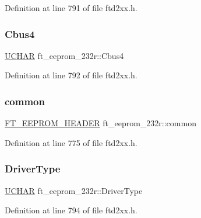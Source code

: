 Definition at line 791 of file ftd2xx.\+h.

\mbox{\label{structft__eeprom__232r_a390714a332684ea05618238e7388773f}} 
\subsubsection{\texorpdfstring{Cbus4}{Cbus4}}
{\footnotesize\ttfamily \hyperlink{CatCaloProto40MHz_2inc_2WinTypes_8h_a4f4bb67531a9bf6f0b9c6ad76aeba587}{U\+C\+H\+AR} ft\+\_\+eeprom\+\_\+232r\+::\+Cbus4}



Definition at line 792 of file ftd2xx.\+h.

\mbox{\label{structft__eeprom__232r_a04ed9a15b88229df4567d6c9ccd6c99d}} 
\subsubsection{\texorpdfstring{common}{common}}
{\footnotesize\ttfamily \hyperlink{LALUsbMLx64_2include_2ftd2xx_8h_ad5a6f519cd67a403fd8742756462394e}{F\+T\+\_\+\+E\+E\+P\+R\+O\+M\+\_\+\+H\+E\+A\+D\+ER} ft\+\_\+eeprom\+\_\+232r\+::common}



Definition at line 775 of file ftd2xx.\+h.

\mbox{\label{structft__eeprom__232r_a43812e19d6119e277b91f10e8db8b651}} 
\subsubsection{\texorpdfstring{Driver\+Type}{DriverType}}
{\footnotesize\ttfamily \hyperlink{CatCaloProto40MHz_2inc_2WinTypes_8h_a4f4bb67531a9bf6f0b9c6ad76aeba587}{U\+C\+H\+AR} ft\+\_\+eeprom\+\_\+232r\+::\+Driver\+Type}



Definition at line 794 of file ftd2xx.\+h.

